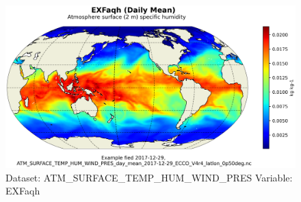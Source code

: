 \begin{figure}[H]
\centering
\includegraphics[scale=0.55]{../images/plots/latlon_plots/Atmosphere_Surface_Temperature_Humidity_Wind_and_Pressure/EXFaqh.png}
\caption{Dataset: ATM\_SURFACE\_TEMP\_HUM\_WIND\_PRES Variable: EXFaqh}
\label{tab:table-ATM_SURFACE_TEMP_HUM_WIND_PRES_EXFaqh-Plot}
\end{figure}
\pagebreak
